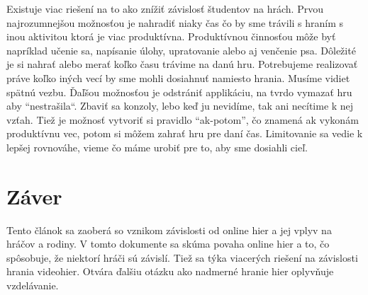 \documentclass[10pt,twoside,english,a4paper]{article}
\begin{document}
Existuje viac riešení na to ako znížiť závislosť študentov na hrách. Prvou najrozumnejšou možnosťou je nahradiť niaky čas čo by sme trávili s hraním s inou aktivitou ktorá je viac produktívna. Produktívnou činnosťou môže byť napríklad učenie sa, napísanie úlohy, upratovanie alebo aj venčenie psa. Dôležité je si nahrať alebo merať koľko času trávime na danú hru. Potrebujeme realizovať práve koľko iných vecí by sme mohli dosiahnuť namiesto hrania. Musíme vidiet spätnú vezbu. Ďaľšou možnosťou je odstrániť applikáciu, na tvrdo vymazať hru aby “nestrašila“. Zbaviť sa konzoly, lebo keď ju nevidíme, tak ani necítime k nej vzťah. Tiež je možnosť vytvoriť si pravidlo “ak-potom”, čo znamená ak vykonám produktívnu vec, potom si môžem zahrať hru pre daní čas. Limitovanie sa vedie k lepšej rovnováhe, vieme čo máme urobiť pre to, aby sme dosiahli cieľ. ~\cite{Gaming_Addiction_Treatment}

\section{Záver} \label{zaver}

Tento článok sa zaoberá so vznikom závislosti od online hier a jej vplyv na hráčov a rodiny. V tomto dokumente sa skúma povaha online hier a to, čo spôsobuje, že niektorí hráči sú závislí. Tiež sa týka viacerých riešení na závislosti hrania videohier. Otvára ďalšiu otázku ako nadmerné hranie hier oplyvňuje vzdelávanie.



\end{document}
